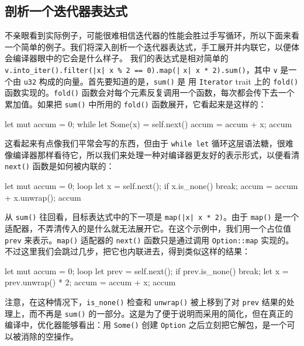\subsection{剖析一个迭代器表达式}
\label{idx:idx_5ae9448d}
不亲眼看到实际例子，可能很难相信迭代器的性能会胜过手写循环，所以下面来看一个简单的例子。我们将深入剖析一个迭代器表达式，手工展开并内联它，以便体会编译器眼中的它会是什么样子。
\label{idx:idx_439767f1}
我们的表达式是相对简单的 \texttt{v.\allowbreak{}into\_\allowbreak{}iter(\allowbreak{})\allowbreak{}.\allowbreak{}filter(\allowbreak{}|x| x \% 2 =\allowbreak{}=\allowbreak{} 0)\allowbreak{}.\allowbreak{}map(\allowbreak{}|}
\texttt{x| x * 2)\allowbreak{}.\allowbreak{}sum(\allowbreak{})\allowbreak{}}，其中 \texttt{v} 是一个由 \texttt{u32} 构成的向量。首先要知道的是，\texttt{sum()} 是
用 \texttt{Iterator} trait 上的 \texttt{fold()} 函数实现的。\texttt{fold()} 函数会对每个元素反复调用一个函数，每次都会传下去一个累加值。如果把 \texttt{sum()} 中所用的 \texttt{fold()} 函数展开，它看起来是这样的：
\begin{codebox}[rust]
let mut accum = 0;
while let Some(x) = self.next() {
    accum = accum + x;
}
accum
\end{codebox}
这看起来有点像我们平常会写的东西，但由于 \texttt{while let} 循环这层语法糖，很难像编译器那样看待它，所以我们来处理一种对编译器更友好的表示形式，以便看清 \texttt{next()} 函数是如何被内联的：
\begin{codebox}[rust]
let mut accum = 0;
loop {
    let x = self.next();
    if x.is_none() {
        break;
    }
    accum = accum + x.unwrap();
}
accum
\end{codebox}
\label{idx:idx_127c5aad}
\label{idx:idx_e9997999}
从 \texttt{sum()} 往回看，目标表达式中的下一项是 \texttt{map(\allowbreak{}|x| x * 2)\allowbreak{}}。由于 \texttt{map()} 是一个适配器，不弄清传入的是什么就无法展开它。在这个示例中，我们用一个占位值 \texttt{prev} 来表示。\texttt{map()} 适配器的 \texttt{next()} 函数只是通过调用 \texttt{Option::map} 实现的。不过这里我们会跳过几步，把它也内联进去，得到类似这样的结果：
\begin{codebox}[rust]
let mut accum = 0;
loop {
    let prev = self.next();
    if prev.is_none() {
        break;
    }
    let x = prev.unwrap() * 2;
    accum = accum + x;
}
accum
\end{codebox}
注意，在这种情况下，\texttt{is\_none()} 检查和 \texttt{unwrap()} 被上移到了对 \texttt{prev} 结果的处理上，而不再是 \texttt{sum()} 的一部分。这是为了便于说明而采用的简化，但在真正的编译中，优化器能够看出：用 \texttt{Some()} 创建 \texttt{Option} 之后立刻把它解包，是一个可以被消除的空操作。
